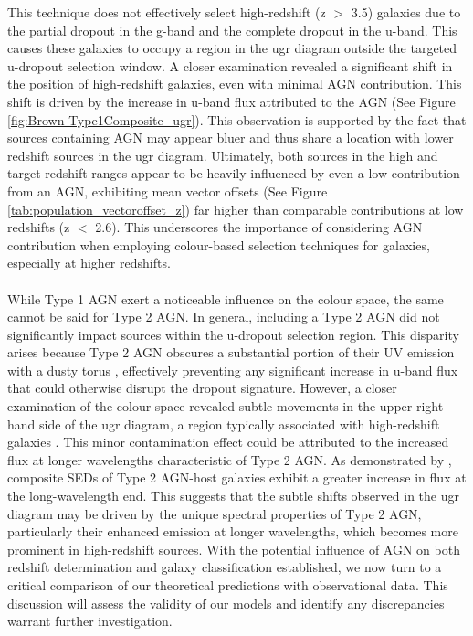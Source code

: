 This technique does not effectively select high-redshift (z $>$ 3.5) galaxies due to the partial dropout in the g-band and the complete dropout in the u-band. This causes these galaxies to occupy a region in the ugr diagram outside the targeted u-dropout selection window. A closer examination revealed a significant shift in the position of high-redshift galaxies, even with minimal AGN contribution. This shift is driven by the increase in u-band flux attributed to the AGN (See Figure \ref{fig:Brown-Type1Composite_ugr}). This observation is supported by the fact that sources containing AGN may appear bluer \citep{pierce_effects_2010} and thus share a location with lower redshift sources in the ugr diagram. Ultimately, both sources in the high and target redshift ranges appear to be heavily influenced by even a low contribution from an AGN, exhibiting mean vector offsets (See Figure \ref{tab:population_vectoroffset_z}) far higher than comparable contributions at low redshifts (z $<$ 2.6). This underscores the importance of considering AGN contribution when employing colour-based selection techniques for galaxies, especially at higher redshifts. \\\\ While Type 1 AGN exert a noticeable influence on the colour space, the same cannot be said for Type 2 AGN. In general, including a Type 2 AGN did not significantly impact sources within the u-dropout selection region. This disparity arises because Type 2 AGN obscures a substantial portion of their UV emission with a dusty torus \citep{hickox_obscured_2018}, effectively preventing any significant increase in u-band flux that could otherwise disrupt the dropout signature. However, a closer examination of the colour space revealed subtle movements in the upper right-hand side of the ugr diagram, a region typically associated with high-redshift galaxies \citep{giavalisco_lyman-break_2002}. This minor contamination effect could be attributed to the increased flux at longer wavelengths characteristic of Type 2 AGN.  As demonstrated by \cite{ciesla_constraining_2015}, composite SEDs of Type 2 AGN-host galaxies exhibit a greater increase in flux at the long-wavelength end. This suggests that the subtle shifts observed in the ugr diagram may be driven by the unique spectral properties of Type 2 AGN, particularly their enhanced emission at longer wavelengths, which becomes more prominent in high-redshift sources. With the potential influence of AGN on both redshift determination and galaxy classification established, we now turn to a critical comparison of our theoretical predictions with observational data. This discussion will assess the validity of our models and identify any discrepancies warrant further investigation.
